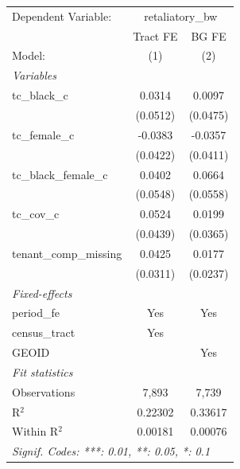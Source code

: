 \begin{tabular}{lcc}
   \tabularnewline \midrule \midrule
   Dependent Variable: & \multicolumn{2}{c}{retaliatory\_bw}\\
                           & Tract FE & BG FE \\   
   Model:                  & (1)      & (2)\\  
   \midrule
   \emph{Variables}\\
   tc\_black\_c            & 0.0314   & 0.0097\\   
                           & (0.0512) & (0.0475)\\   
   tc\_female\_c           & -0.0383  & -0.0357\\   
                           & (0.0422) & (0.0411)\\   
   tc\_black\_female\_c    & 0.0402   & 0.0664\\   
                           & (0.0548) & (0.0558)\\   
   tc\_cov\_c              & 0.0524   & 0.0199\\   
                           & (0.0439) & (0.0365)\\   
   tenant\_comp\_missing   & 0.0425   & 0.0177\\   
                           & (0.0311) & (0.0237)\\   
   \midrule
   \emph{Fixed-effects}\\
   period\_fe              & Yes      & Yes\\  
   census\_tract           & Yes      & \\  
   GEOID                   &          & Yes\\  
   \midrule
   \emph{Fit statistics}\\
   Observations            & 7,893    & 7,739\\  
   R$^2$                   & 0.22302  & 0.33617\\  
   Within R$^2$            & 0.00181  & 0.00076\\  
   \midrule \midrule
   \multicolumn{3}{l}{\emph{Signif. Codes: ***: 0.01, **: 0.05, *: 0.1}}\\
\end{tabular}
\par\endgroup
